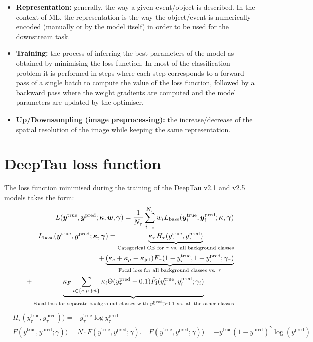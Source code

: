 \begin{itemize}
    \item[] \textbf{Representation:} generally, the way a given event/object is described. In the context of ML, the representation is the way the object/event is numerically encoded (manually or by the model itself) in order to be used for the downstream task.   

    \item[] \textbf{Training:} the process of inferring the best parameters of the model as obtained by minimising the loss function. In most of the classification problem it is performed in steps where each step corresponds to a forward pass of a single batch to compute the value of the loss function, followed by a backward pass where the weight gradients are computed and the model parameters are updated by the optimiser. 

    \item[] \textbf{Up/Downsampling (image preprocessing):} the increase/decrease of the spatial resolution of the image while keeping the same representation. 
\end{itemize}



\section{DeepTau loss function}\label{app:loss}
The loss function minimised during the training of the DeepTau v2.1 and v2.5 models takes the form:
\begin{align*}
    L(\yt, \yp; \boldsymbol{\kappa}, \boldsymbol{w}, \boldsymbol{\gamma}) = \dfrac{1}{N_\tau}\sum_{i=1}^{N_\tau}w_i L_\text{base}(\yt_i, \yp_i; \boldsymbol{\kappa}, \boldsymbol{\gamma})\\
    L_\text{base}(\yt, \yp; \boldsymbol{\kappa}, \boldsymbol{\gamma}) = \underbrace{\kappa_\tau H_\tau(y_\tau^\text{true}, y_\tau^\text{pred})}_{\text{Categorical CE for }\tau \text{ vs. all background classes}}\\
    + \underbrace{(\kappa_e + \kappa_\mu + \kappa_\text{jet})\bar{F}_\tau(1-y_\tau^\text{true}, 1-y_\tau^\text{pred}; \gamma_\tau)}_{\text{Focal loss for all background classes vs. } \tau} \\ %
    + \underbrace{\kappa_F\sum_{i \in \{e, \mu, \text{jet}\}}\kappa_i \Theta(y_\tau^\text{pred} - 0.1)\bar{F}_\text{i}(y_i^\text{true}, y_i^\text{pred}; \gamma_i)}_{\text{Focal loss for separate background classes with } y_\tau^\text{pred} > 0.1 \text{ vs. all the other classes}}\\
\end{align*}
\begin{align*}
    &H_\tau(y_\tau^\text{true}, y_\tau^\text{pred})) = -y_\tau^\text{true} \log y_\tau^\text{pred}\\
    &\bar{F}(y^\text{true}, y^\text{pred}; \gamma)) = N \cdot F(y^\text{true}, y^\text{pred}; \gamma). \quad F(y^\text{true}, y^\text{pred}; \gamma)) = - y^\text{true} (1-y^\text{pred})^\gamma \log(y^\text{pred})\\
\end{align*}

